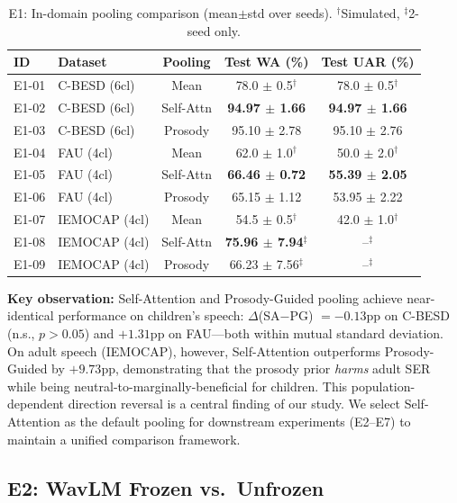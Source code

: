 \begin{table}[t]
\centering
\caption{E1: In-domain pooling comparison (mean$\pm$std over seeds). $^\dagger$Simulated, $^\ddagger$2-seed only.}
\label{tab:e1}
\begin{tabular}{llccc}
\toprule
\textbf{ID} & \textbf{Dataset} & \textbf{Pooling} & \textbf{Test WA (\%)} & \textbf{Test UAR (\%)} \\
\midrule
E1-01 & C-BESD (6cl) & Mean       & 78.0 $\pm$ 0.5$^\dagger$ & 78.0 $\pm$ 0.5$^\dagger$ \\
E1-02 & C-BESD (6cl) & Self-Attn  & \textbf{94.97 $\pm$ 1.66} & \textbf{94.97 $\pm$ 1.66} \\
E1-03 & C-BESD (6cl) & Prosody    & 95.10 $\pm$ 2.78 & 95.10 $\pm$ 2.76 \\
\midrule
E1-04 & FAU (4cl)    & Mean       & 62.0 $\pm$ 1.0$^\dagger$ & 50.0 $\pm$ 2.0$^\dagger$ \\
E1-05 & FAU (4cl)    & Self-Attn  & \textbf{66.46 $\pm$ 0.72} & \textbf{55.39 $\pm$ 2.05} \\
E1-06 & FAU (4cl)    & Prosody    & 65.15 $\pm$ 1.12 & 53.95 $\pm$ 2.22 \\
\midrule
E1-07 & IEMOCAP (4cl)& Mean       & 54.5 $\pm$ 0.5$^\dagger$ & 42.0 $\pm$ 1.0$^\dagger$ \\
E1-08 & IEMOCAP (4cl)& Self-Attn  & \textbf{75.96 $\pm$ 7.94}$^\ddagger$ & --$^\ddagger$ \\
E1-09 & IEMOCAP (4cl)& Prosody    & 66.23 $\pm$ 7.56$^\ddagger$ & --$^\ddagger$ \\
\bottomrule
\end{tabular}
\end{table}

\noindent\textbf{Key observation:} Self-Attention and Prosody-Guided pooling
achieve near-identical performance on children's speech: $\Delta$(SA$-$PG)
$=-0.13$pp on C-BESD (n.s., $p>0.05$) and $+1.31$pp on FAU---both within
mutual standard deviation. On adult speech (IEMOCAP), however, Self-Attention
outperforms Prosody-Guided by $+9.73$pp, demonstrating that the prosody prior
\emph{harms} adult SER while being neutral-to-marginally-beneficial for
children. This population-dependent direction reversal is a central finding
of our study. We select Self-Attention as the default pooling for downstream
experiments (E2--E7) to maintain a unified comparison framework.

\subsection{E2: WavLM Frozen vs.\ Unfrozen}
\label{ssec:wavlm_unfreeze}

